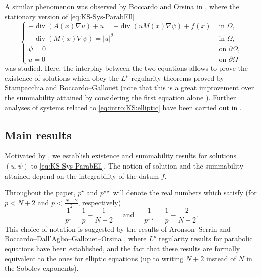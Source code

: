 \documentclass{amsart}
\numberwithin{equation}{section}
\def\elle#1{L^{#1}}
\begin{document}
A similar phenomenon was observed by Boccardo and Orsina in \cite{BO-Kellersegel}, where the stationary version of \eqref{eq:KS-Sys-ParabEll}
\begin{equation}\label{eq:intro:KS:elliptic}
    \left\{\begin{array}{cc}
    -\operatorname{div}(A(x) \nabla u)+u=-\operatorname{div}(u M(x) \nabla \psi)+f(x) & \text { in } \Omega, \\
    -\operatorname{div}(M(x) \nabla \psi)=|u|^\theta & \text { in } \Omega, \\
    \psi=0 & \text { on } \partial\Omega, \\
    u=0 & \text { on } \partial\Omega
    \end{array}\right.
\end{equation}
was studied. Here, the interplay between the two equations allows to prove the existence of solutions which obey the $\elle p$-regularity theorems proved by Stampacchia and Boccardo--Gallou\"et \cite{BoccardoGallouet,StampacchiaElliptic} (note that this is a great improvement over the summability attained by considering the first equation alone \cite{BoccardoJDE}). Further analyses of systems related to \eqref{eq:intro:KS:elliptic} have been carried out in  \cite{boccardo2022EllipticChemotaxisSystem,boccardo2026ExistenceResultsNonlinear,boccardo_elliptic_2023}.

\subsection{Main results}

Motivated by \cite{BO-Kellersegel,KSParabEll}, we establish existence and summability results for solutions $(u,\psi)$ to \eqref{eq:KS-Sys-ParabEll}. The notion of solution and the summability attained depend on the integrability of the datum $f$.

Throughout the paper, $p^\star$ and $p^{\star\star}$ will denote the real numbers which satisfy (for $p<N+2$ and $p<\frac{N+2}{2}$, respectively) 
$$\frac{1}{p^\star}=\frac{1}{p}-\frac{1}{N+2}\quad\text{ and }\quad \frac{1}{p^{\star\star}}=\frac{1}{p}-\frac{2}{N+2}.$$ 
This choice of notation is suggested by the results of Aronson--Serrin \cite{Aronson-Serrin} and Boccardo--Dall'Aglio--Gallou\"et--Orsina \cite{BDGO-parabolic}, where $L^p$ regularity results for parabolic equations have been established, and the fact that these results are formally equivalent to the ones for elliptic equations (up to writing $N+2$ instead of $N$ in the Sobolev exponents).
\end{document}
